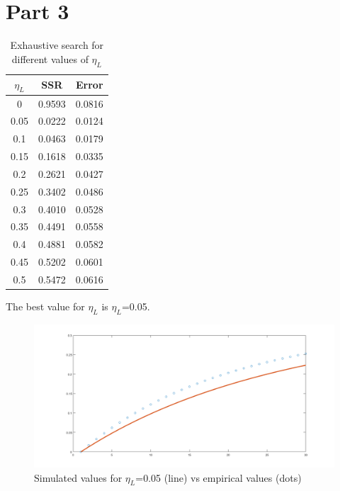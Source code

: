 \documentclass[a4paper]{article}
\begin{document}
\section{Part 3}

\begin{table}[H]
\centering
\begin{adjustbox}{width=0.4\textwidth,center=\textwidth}
\begin{tabular}{c|c|c}
\textbf{$\eta_{L}$} & \textbf{SSR} & Error\\ \hline
                                                                                                                 
                                   
0 & 0.9593 & 0.0816  \\                                       
0.05 & 0.0222 &  0.0124  \\
0.1  & 0.0463  & 0.0179 \\
0.15  &  0.1618 & 0.0335  \\  
0.2  & 0.2621   & 0.0427\\
0.25 & 0.3402 &  0.0486\\
0.3 & 0.4010 &  0.0528  \\
0.35 & 0.4491  &  0.0558  \\ 
0.4  & 0.4881 & 0.0582 \\
0.45  & 0.5202 &  0.0601\\
0.5 &  0.5472 & 0.0616 
\end{tabular}
\end{adjustbox}
\caption{Exhaustive search for different values of $\eta_{L}$}
\label{tab:exaustive_searchSSR}
\end{table}
The best value for $\eta_{L}$ is $\eta_{L}$=0.05.

\begin{figure}[H]
\center
\includegraphics[width=1.3\textwidth]{res/img/plotdiff}
\caption{Simulated values for  $\eta_{L}$=0.05 (line) vs empirical values (dots)}
\label{fig:part3}
\end{figure}
\end{document}
